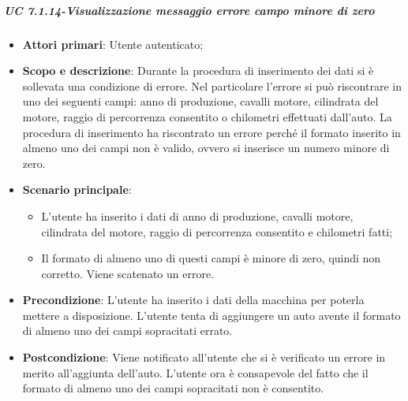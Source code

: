                  
                 \subparagraph{UC 7.1.14-Visualizzazione messaggio errore campo minore di zero} 
    \begin{itemize}
                \item \textbf{Attori primari}: Utente autenticato;
               
                 \item \textbf{Scopo e descrizione}: Durante la procedura di inserimento dei dati si è sollevata una condizione di errore. Nel particolare l'errore si può riscontrare in uno dei seguenti campi: anno di produzione, cavalli motore, cilindrata del motore, raggio di percorrenza consentito o chilometri effettuati dall'auto. La procedura di inserimento ha riscontrato un errore perché il formato inserito in almeno uno dei campi non è valido, ovvero si inserisce un numero minore di zero.
                 \item \textbf{Scenario principale}: 
                 \begin{itemize}
                     \item L'utente ha inserito i dati di anno di produzione, cavalli motore, cilindrata del motore, raggio di percorrenza consentito e chilometri fatti;
                     \item Il formato di almeno uno di questi campi è minore di zero, quindi non corretto. Viene scatenato un errore.
                 \end{itemize}
                 \item \textbf{Precondizione}: L'utente ha inserito i dati della macchina per poterla mettere a disposizione. L'utente tenta di aggiungere un auto avente il formato di almeno uno dei campi sopracitati errato.
                 \item \textbf{Postcondizione}: Viene notificato all'utente che si è verificato un errore in merito all'aggiunta dell'auto. L'utente ora è consapevole del fatto che il formato di almeno uno dei campi sopracitati non è consentito.
                 \end{itemize}
         
